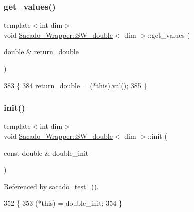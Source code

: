 \subsubsection{\texorpdfstring{get\+\_\+values()}{get\_values()}}
{\footnotesize\ttfamily template$<$int dim$>$ \\
void \hyperlink{classSacado__Wrapper_1_1SW__double}{Sacado\+\_\+\+Wrapper\+::\+S\+W\+\_\+double}$<$ dim $>$\+::get\+\_\+values (\begin{DoxyParamCaption}\item[{double \&}]{return\+\_\+double }\end{DoxyParamCaption})}


\begin{DoxyCode}
383     \{
384         return\_double = (*this).val();
385     \}
\end{DoxyCode}
\mbox{\label{classSacado__Wrapper_1_1SW__double_adca799dd92dadebda9aebc91c797682a}} 
\subsubsection{\texorpdfstring{init()}{init()}}
{\footnotesize\ttfamily template$<$int dim$>$ \\
void \hyperlink{classSacado__Wrapper_1_1SW__double}{Sacado\+\_\+\+Wrapper\+::\+S\+W\+\_\+double}$<$ dim $>$\+::init (\begin{DoxyParamCaption}\item[{const double \&}]{double\+\_\+init }\end{DoxyParamCaption})}



Referenced by sacado\+\_\+test\+\_().


\begin{DoxyCode}
352     \{
353         (*this) = double\_init;
354     \}
\end{DoxyCode}
\mbox{\label{classSacado__Wrapper_1_1SW__double_a355de495ebe0e0b78ea4569fbb697717}} 

